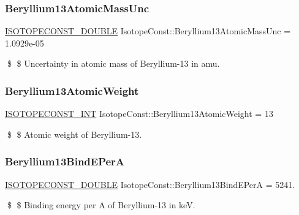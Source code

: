 \subsubsection{\texorpdfstring{Beryllium13\+Atomic\+Mass\+Unc}{Beryllium13AtomicMassUnc}}
{\footnotesize\ttfamily \mbox{\hyperlink{group___isotope_const-_macros_ga8f45a7272ce02c0b4c65c44636ed719a}{I\+S\+O\+T\+O\+P\+E\+C\+O\+N\+S\+T\+\_\+\+D\+O\+U\+B\+LE}} Isotope\+Const\+::\+Beryllium13\+Atomic\+Mass\+Unc = 1.\+0929e-\/05}

\$ \$ Uncertainty in atomic mass of Beryllium-\/13 in amu. \mbox{\label{group___isotope_const-_beryllium-_be13_ga1f65748962a2798d9ea4bb8cb2e7db1c}} 
\subsubsection{\texorpdfstring{Beryllium13\+Atomic\+Weight}{Beryllium13AtomicWeight}}
{\footnotesize\ttfamily \mbox{\hyperlink{group___isotope_const-_macros_ga5f18360b3e99483a35c32d789e62621c}{I\+S\+O\+T\+O\+P\+E\+C\+O\+N\+S\+T\+\_\+\+I\+NT}} Isotope\+Const\+::\+Beryllium13\+Atomic\+Weight = 13}

\$ \$ Atomic weight of Beryllium-\/13. \mbox{\label{group___isotope_const-_beryllium-_be13_gae50e5c925f8896596b244d09ec6e1a66}} 
\subsubsection{\texorpdfstring{Beryllium13\+Bind\+E\+PerA}{Beryllium13BindEPerA}}
{\footnotesize\ttfamily \mbox{\hyperlink{group___isotope_const-_macros_ga8f45a7272ce02c0b4c65c44636ed719a}{I\+S\+O\+T\+O\+P\+E\+C\+O\+N\+S\+T\+\_\+\+D\+O\+U\+B\+LE}} Isotope\+Const\+::\+Beryllium13\+Bind\+E\+PerA = 5241.}

\$ \$ Binding energy per A of Beryllium-\/13 in keV. \mbox{\label{group___isotope_const-_beryllium-_be13_ga270846ee7a5be494b191233c87140dac}} 
